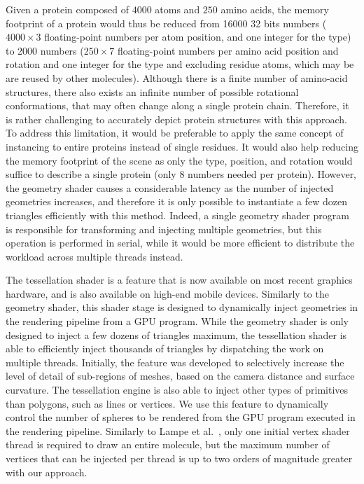 Given a protein composed of $4000$ atoms and $250$ amino acids, the memory footprint of a protein would thus be reduced from 16000 32 bits numbers ($4000 \times 3$ floating-point numbers per atom position, and one integer for the type) to 2000 numbers ($250 \times 7$ floating-point numbers per amino acid position and rotation and one integer for the type and excluding residue atoms, which may be are reused by other molecules).
Although there is a finite number of amino-acid structures, there also exists an infinite number of possible rotational conformations, that may often change along a single protein chain.
Therefore, it is rather challenging to accurately depict protein structures with this approach.
To address this limitation, it would be preferable to apply the same concept of instancing to entire proteins instead of single residues.
It would also help reducing the memory footprint of the scene as only the type, position, and rotation would suffice to describe a single protein (only 8 numbers needed per protein).
However, the geometry shader causes a considerable latency as the number of injected geometries increases, and therefore it is only possible to instantiate a few dozen triangles efficiently with this method.
Indeed, a single geometry shader program is responsible for transforming and injecting multiple geometries, but this operation is performed in serial, while it would be more efficient to distribute the workload across multiple threads instead.

The tessellation shader is a feature that is now available on most recent graphics hardware, and is also available on high-end mobile devices.
Similarly to the geometry shader, this shader stage is designed to dynamically inject geometries in the rendering pipeline from a GPU program.
While the geometry shader is only designed to inject a few dozens of triangles maximum, the tessellation shader is able to efficiently inject thousands of triangles by dispatching the work on multiple threads.
Initially, the feature was developed to selectively increase the level of detail of sub-regions of meshes, based on the camera distance and surface curvature.
The tessellation engine is also able to inject other types of primitives than polygons, such as lines or vertices.
We use this feature to dynamically control the number of spheres to be rendered from the GPU program executed in the rendering pipeline.
Similarly to Lampe et al.~\cite{lampe2007two}, only one initial vertex shader thread is required to draw an entire molecule, but the maximum number of vertices that can be injected per thread is up to two orders of magnitude greater with our approach.

